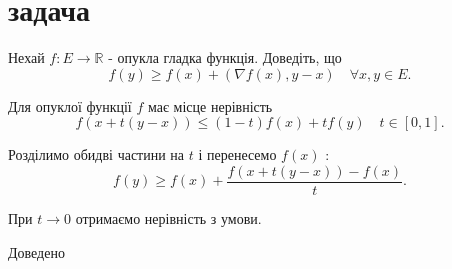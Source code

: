 
\section{задача}
\begin{tcolorbox}[title=Умова]
    Нехай $f: E \rightarrow \mathbb{R}$ - опукла гладка функція. Доведіть, що
    $$
    f(y) \geq f(x)+(\nabla f(x), y-x) \quad \forall x, y \in E .
    $$
\end{tcolorbox}

Для опуклої функції $f$ має місце нерівність
$$
f(x+t(y-x)) \leq(1-t) f(x)+t f(y) \quad t \in[0,1] .
$$

Розділимо обидві частини на $t$ і перенесемо $f(x)$ :
$$
f(y) \geq f(x)+\frac{f(x+t(y-x))-f(x)}{t} .
$$

При $t \rightarrow 0$ отримаємо нерівність з умови.


Доведено
